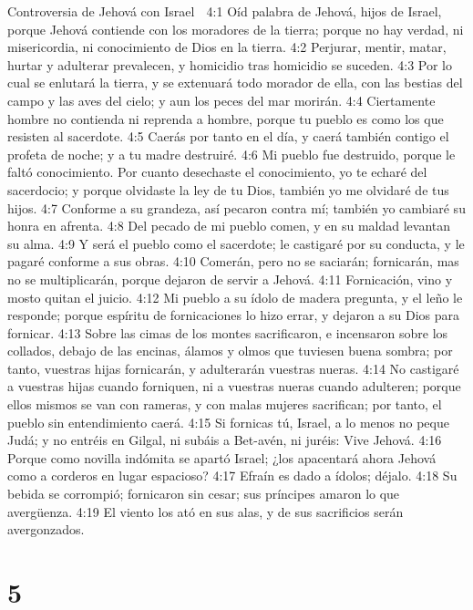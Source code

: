 Controversia de Jehová con Israel  

4:1 Oíd palabra de Jehová, hijos de Israel, porque Jehová contiende con los moradores de la tierra; porque no hay verdad, ni misericordia, ni conocimiento de Dios en la tierra.  
4:2 Perjurar, mentir, matar, hurtar y adulterar prevalecen, y homicidio tras homicidio se suceden.  
4:3 Por lo cual se enlutará la tierra, y se extenuará todo morador de ella, con las bestias del campo y las aves del cielo; y aun los peces del mar morirán.  
4:4 Ciertamente hombre no contienda ni reprenda a hombre, porque tu pueblo es como los que resisten al sacerdote.  
4:5 Caerás por tanto en el día, y caerá también contigo el profeta de noche; y a tu madre destruiré.  
4:6 Mi pueblo fue destruido, porque le faltó conocimiento. Por cuanto desechaste el conocimiento, yo te echaré del sacerdocio; y porque olvidaste la ley de tu Dios, también yo me olvidaré de tus hijos.  
4:7 Conforme a su grandeza, así pecaron contra mí; también yo cambiaré su honra en afrenta.  
4:8 Del pecado de mi pueblo comen, y en su maldad levantan su alma.  
4:9 Y será el pueblo como el sacerdote; le castigaré por su conducta, y le pagaré conforme a sus obras.  
4:10 Comerán, pero no se saciarán; fornicarán, mas no se multiplicarán, porque dejaron de servir a Jehová.  
4:11 Fornicación, vino y mosto quitan el juicio.  
4:12 Mi pueblo a su ídolo de madera pregunta, y el leño le responde; porque espíritu de fornicaciones lo hizo errar, y dejaron a su Dios para fornicar.  
4:13 Sobre las cimas de los montes sacrificaron, e incensaron sobre los collados, debajo de las encinas, álamos y olmos que tuviesen buena sombra; por tanto, vuestras hijas fornicarán, y adulterarán vuestras nueras.  
4:14 No castigaré a vuestras hijas cuando forniquen, ni a vuestras nueras cuando adulteren; porque ellos mismos se van con rameras, y con malas mujeres sacrifican; por tanto, el pueblo sin entendimiento caerá.  
4:15 Si fornicas tú, Israel, a lo menos no peque Judá; y no entréis en Gilgal, ni subáis a Bet-avén, ni juréis: Vive Jehová.  
4:16 Porque como novilla indómita se apartó Israel; ¿los apacentará ahora Jehová como a corderos en lugar espacioso?  
4:17 Efraín es dado a ídolos; déjalo.  
4:18 Su bebida se corrompió; fornicaron sin cesar; sus príncipes amaron lo que avergüenza.  
4:19 El viento los ató en sus alas, y de sus sacrificios serán avergonzados.  

\chapter{5}

